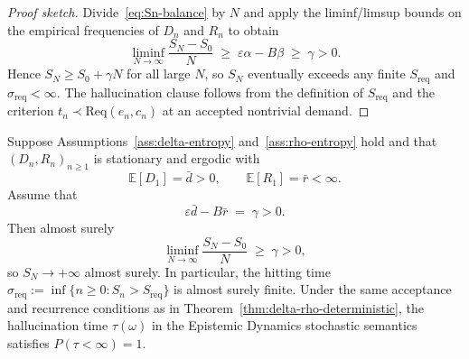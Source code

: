 \begin{proof}[Proof sketch]
Divide~\eqref{eq:Sn-balance} by $N$ and apply the liminf/limsup bounds on the empirical
frequencies of $D_n$ and $R_n$ to obtain
\[
  \liminf_{N \to \infty} \frac{S_N - S_0}{N}
  \;\ge\; \varepsilon \alpha - B \beta \;\ge\; \gamma > 0.
\]
Hence $S_N \ge S_0 + \gamma N$ for all large $N$, so $S_N$ eventually exceeds any finite
$S_{\mathrm{req}}$ and $\sigma_{\mathrm{req}} < \infty$. The hallucination clause follows from the
definition of $S_{\mathrm{req}}$ and the criterion $t_n \prec \mathrm{Req}(e_n,c_n)$ at an accepted
nontrivial demand.
\end{proof}
\begin{theorem}\label{thm:delta-rho-stochastic}
Suppose Assumptions~\ref{ass:delta-entropy} and~\ref{ass:rho-entropy} hold and that
$(D_n,R_n)_{n \ge 1}$ is stationary and ergodic with
\[
  \mathbb{E}[D_1] = \bar{d} > 0,
  \qquad
  \mathbb{E}[R_1] = \bar{r} < \infty.
\]
Assume that
\[
  \varepsilon \bar{d} - B \bar{r} \;=\; \gamma > 0.
\]
Then almost surely
\[
  \liminf_{N \to \infty} \frac{S_N - S_0}{N} \;\ge\; \gamma > 0,
\]
so $S_N \to +\infty$ almost surely. In particular, the hitting time
$\sigma_{\mathrm{req}} := \inf\{n \ge 0 : S_n > S_{\mathrm{req}}\}$ is almost surely finite. Under the
same acceptance and recurrence conditions as in Theorem~\ref{thm:delta-rho-deterministic}, the
hallucination time $\tau(\omega)$ in the Epistemic Dynamics stochastic semantics satisfies $P(\tau < \infty) = 1$.
\end{theorem}

